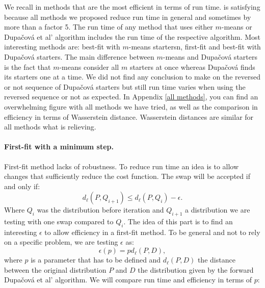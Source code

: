 \documentclass{amsart}
\begin{document}
We recall in  methods that are the most efficient in terms of run time.  is satisfying because all methods we proposed reduce run time in general and sometimes by more than a factor 5. The run time of any method that uses either $m$-means or Dupačová et al' algorithm includes the run time of the respective algorithm. Most interesting methods are: best-fit with $m$-means startersn, first-fit and best-fit with Dupačová starters. The main difference between $m$-means and Dupačová starters is the fact that $m$-means consider all $m$ starters at once whereas Dupačová finds its starters one at a time. We did not find any conclusion to make on the reversed or not sequence of Dupačová starters but still run time varies when using the reversed sequence or not as expected. In Appendix \ref{all methods}, you can find an overwhelming figure with all methods we have tried, as well as the comparison in efficiency in terms of Wasserstein distance. Wasserstein distances are similar for all methods what is relieving. 


\paragraph{\textbf{First-fit with a minimum step.}}\label{step}
First-fit method lacks of robustness. To reduce run time an idea is to allow changes that sufficiently reduce the cost function. The swap will be accepted if and only if: $$
d_\ell\left(P,Q_{i+1}\right) \leq d_\ell\left(P,Q_i\right) - \epsilon.
$$
Where $Q_i$ was the distribution before iteration and $Q_{i+1}$ a distribution we are testing with one swap compared to $Q_i$. The idea of this part is to find an interesting $\epsilon$ to allow efficiency in a first-fit method. To be general and not to rely on a specific problem, we are testing $\epsilon$ as: $$\epsilon\left(p\right)=pd_\ell\left(P,D\right),$$ where $p$ is a parameter that has to be defined and $d_\ell\left(P,D\right)$ the distance between the original distribution $P$ and $D$ the distribution given by the forward Dupačová et al' algorithm. We will compare run time and efficiency in terms of $p$:
\end{document}

